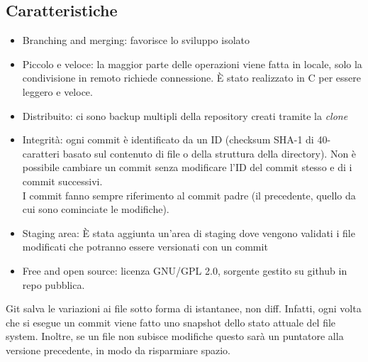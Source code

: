 \documentclass[10pt, a4paper]{article}
\begin{document}
\subsection{Caratteristiche}
\begin{itemize}
    \item Branching and merging: favorisce lo sviluppo isolato
    \item Piccolo e veloce: la maggior parte delle operazioni viene fatta in locale, solo la condivisione in remoto richiede connessione. È stato realizzato in C per essere leggero e veloce.
    \item Distribuito: ci sono backup multipli della repository creati tramite la \textit{clone}
    \item Integrità: ogni commit è identificato da un ID (checksum SHA-1 di 40-caratteri basato sul contenuto di file o della struttura della directory). Non è possibile cambiare un commit senza modificare l’ID del commit stesso e di i commit successivi.\\
    I commit fanno sempre riferimento al commit padre (il precedente, quello da cui sono cominciate le modifiche).
    \item Staging area: È stata aggiunta un’area di staging dove vengono validati i file modificati che potranno essere versionati con un commit
    \item Free and open source: licenza GNU/GPL 2.0, sorgente gestito su github in repo pubblica.
\end{itemize}
Git salva le variazioni ai file sotto forma di istantanee, non diff. Infatti, ogni volta che si esegue un commit viene fatto uno snapshot dello stato attuale del file system. Inoltre, se un file non subisce modifiche questo sarà un puntatore alla versione precedente, in modo da risparmiare spazio.
\end{document}
